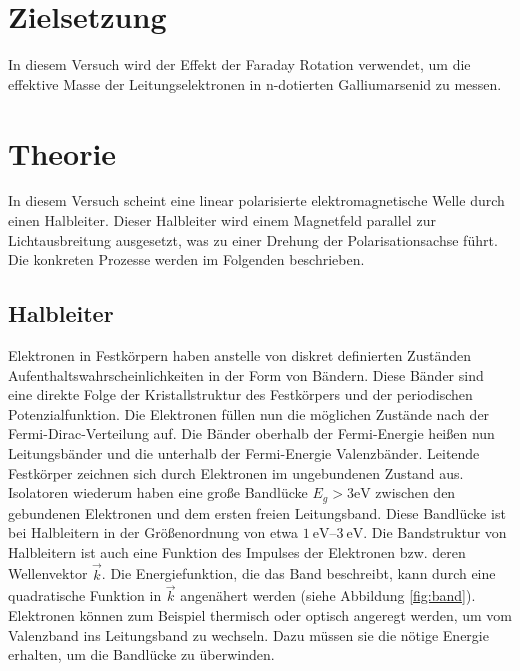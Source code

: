 \section{Zielsetzung}
In diesem Versuch wird der Effekt der Faraday Rotation verwendet, um die
effektive Masse der Leitungselektronen in n-dotierten Galliumarsenid zu messen.

\section{Theorie}
In diesem Versuch scheint eine linear polarisierte elektromagnetische Welle
durch einen Halbleiter. Dieser Halbleiter wird einem Magnetfeld parallel zur
Lichtausbreitung ausgesetzt, was zu einer Drehung der Polarisationsachse führt.
Die konkreten Prozesse werden im Folgenden beschrieben.

\subsection{Halbleiter \cite[][Kap. 13, 14]{book:expi3}}

Elektronen in Festkörpern haben anstelle von diskret definierten Zuständen
Aufenthaltswahrscheinlichkeiten in der Form von Bändern. Diese Bänder sind eine
direkte Folge der Kristallstruktur des Festkörpers und der periodischen
Potenzialfunktion.
Die Elektronen füllen nun die möglichen Zustände nach der
Fermi-Dirac-Verteilung auf. Die Bänder oberhalb der Fermi-Energie heißen nun
Leitungsbänder und die unterhalb der Fermi-Energie Valenzbänder. Leitende
Festkörper zeichnen sich durch Elektronen im ungebundenen Zustand aus.
Isolatoren wiederum haben eine große Bandlücke $E_g > 3 \unit{\eV}$
\cite{web:Bandlücke} zwischen den gebundenen Elektronen und dem ersten freien
Leitungsband. Diese Bandlücke ist bei Halbleitern in der Größenordnung von etwa
$\qtyrange{1}{3}{\eV}$\cite{web:Bandlücke}. Die Bandstruktur von Halbleitern
ist auch eine Funktion des Impulses der Elektronen bzw. deren Wellenvektor
$\vec{k}$. Die Energiefunktion, die das Band beschreibt, kann durch eine
quadratische Funktion in $\vec{k}$ angenähert werden (siehe Abbildung
\ref{fig:band}). Elektronen können zum Beispiel thermisch oder optisch angeregt
werden, um vom Valenzband ins Leitungsband zu wechseln. Dazu müssen sie die
nötige Energie erhalten, um die Bandlücke zu überwinden.



